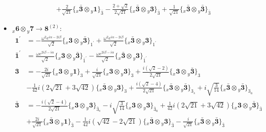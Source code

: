 \documentclass[english]{article}
\newcommand{\rep}[1]{\mathbf{#1}}
\newcommand{\repx}[2]{{}_{#2}\mathbf{#1}}
\newcommand{\tsprodx}[2]{\repx{#1}{x}\otimes\repx{#2}{y}}
\newcommand{\subcgt}[3]{\big\{ \tsprodx{#1}{#2}\big\}^{}_{#3}}
\begin{document}
\begin{itemize}
\begin{align*}
 & +\frac{2}{\sqrt{21}}\subcgt{\bar{3}}{1}{\bar{3}}-\frac{2+\sqrt{2}}{2 \sqrt{21}}\subcgt{\bar{3}}{3}{\bar{3}}+\frac{1}{\sqrt{21}}\subcgt{\bar{3}}{\bar{3}}{\bar{3}}
\end{align*}
\item $\tsprodx{6}{7}\to\rep{8}^{(2)}$:
\begin{align*}
\rep{1^{\prime}} & = -\frac{\omega ^2 e^{i \alpha -2 i \beta }}{\sqrt{2}}\subcgt{3}{\bar{3}}{1^{\prime}}+\frac{\omega ^2 e^{i \alpha -2 i \beta }}{\sqrt{2}}\subcgt{\bar{3}}{3}{1^{\prime}}
\\
\rep{\bar{1}^{\prime}} & = \frac{\omega  e^{2 i \beta -i \alpha }}{\sqrt{2}}\subcgt{3}{\bar{3}}{\bar{1}^{\prime}}-\frac{\omega  e^{2 i \beta -i \alpha }}{\sqrt{2}}\subcgt{\bar{3}}{3}{\bar{1}^{\prime}}
\\
\rep{3} & = -\frac{2 i}{\sqrt{21}}\subcgt{3}{1}{3}+\frac{i}{\sqrt{21}}\subcgt{3}{3}{3}+\frac{i \left(\sqrt{2}-2\right)}{2 \sqrt{21}}\subcgt{3}{\bar{3}}{3} \\ 
 & -\frac{1}{42} i \left(2 \sqrt{21}+3 \sqrt{42}\right)\subcgt{\bar{3}}{3}{3}+\frac{i \left(\sqrt{2}-4\right)}{2 \sqrt{21}}\subcgt{\bar{3}}{\bar{3}}{3_{s}}+i \sqrt{\frac{3}{14}}\subcgt{\bar{3}}{\bar{3}}{3_{a}}
\\
\rep{\bar{3}} & = -\frac{i \left(\sqrt{2}-4\right)}{2 \sqrt{21}}\subcgt{3}{3}{\bar{3}_{s}}-i \sqrt{\frac{3}{14}}\subcgt{3}{3}{\bar{3}_{a}}+\frac{1}{42} i \left(2 \sqrt{21}+3 \sqrt{42}\right)\subcgt{3}{\bar{3}}{\bar{3}} \\ 
 & +\frac{2 i}{\sqrt{21}}\subcgt{\bar{3}}{1}{\bar{3}}-\frac{1}{42} i \left(\sqrt{42}-2 \sqrt{21}\right)\subcgt{\bar{3}}{3}{\bar{3}}-\frac{i}{\sqrt{21}}\subcgt{\bar{3}}{\bar{3}}{\bar{3}}
\end{align*}
\end{itemize}
\end{document}
